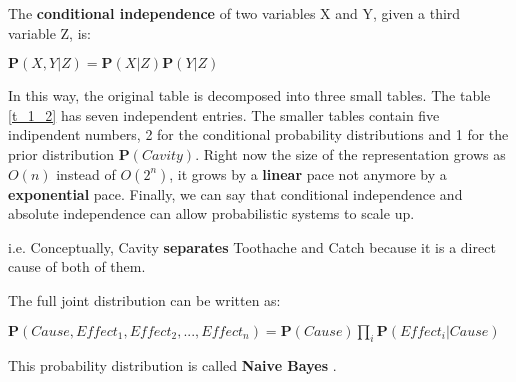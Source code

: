 \begin{definition}
    The \textbf{conditional independence} of two variables X and Y, given a third variable Z, is:
    \begin{center}
        $\mathbf{P}(X,Y|Z)=\mathbf{P}(X|Z)\mathbf{P}(Y|Z)$
    \end{center}
\end{definition}
In this way, the original table is decomposed into three small tables. The table \ref{t_1_2} has seven independent entries. The smaller tables contain five indipendent numbers, 2 for the conditional probability distributions and 1 for the prior distribution $\mathbf{P}(Cavity)$. Right now the size of the representation grows as $O(n)$ instead of $O(2^n)$, it grows by a \textbf{linear} pace not anymore by a \textbf{exponential} pace. Finally, we can say that conditional independence and absolute independence can allow probabilistic systems to scale up.
\begin{example}
    i.e. Conceptually, Cavity \textbf{separates} Toothache and Catch because it is a direct cause of both of them.
    \begin{center}
    \end{center}
\end{example}
\begin{definition}
    The full joint distribution can be written as: \vspace{3.5pt}

    \begin{center}
        $\mathbf{P}(Cause, Effect_1, Effect_2, ..., Effect_n) = \mathbf{P}(Cause)\prod_i\mathbf{P}(Effect_i|Cause)$
    \end{center} \vspace{3.5pt}

    This probability distribution is called \textbf{Naive Bayes} .
\end{definition}